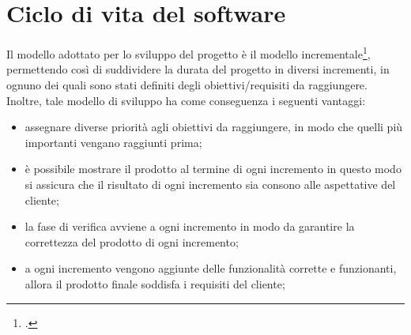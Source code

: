 

\section{Ciclo di vita del software}\label{sec:ciclo-vita-software}
Il modello adottato per lo sviluppo del progetto è il modello incrementale\footcite{womak:ingegneria-software}, permettendo così di suddividere la durata del progetto in diversi incrementi, in ognuno dei quali sono stati definiti degli obiettivi/requisiti da raggiungere.
Inoltre, tale modello di sviluppo ha come conseguenza i seguenti vantaggi:
\begin{itemize}
    \item assegnare diverse priorità agli obiettivi da raggiungere, in modo che quelli più importanti vengano raggiunti prima;
    \item è possibile mostrare il prodotto al termine di ogni incremento in questo modo si assicura che il risultato di ogni incremento sia consono alle aspettative del cliente;
    \item la fase di verifica avviene a ogni incremento in modo da garantire la correttezza del prodotto di ogni incremento;
    \item a ogni incremento vengono aggiunte delle funzionalità corrette e funzionanti, allora il prodotto finale soddisfa i requisiti del cliente;
\end{itemize}